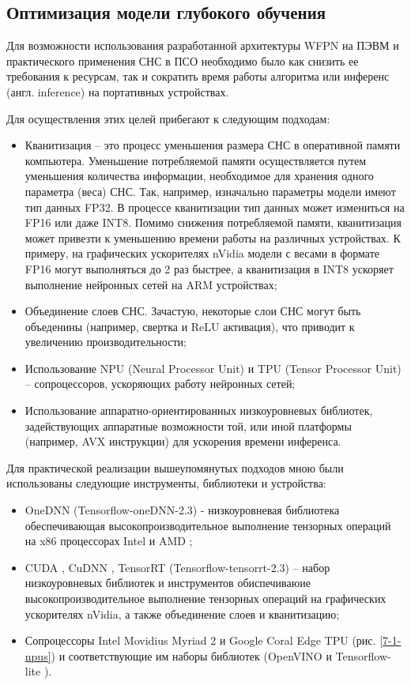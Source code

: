 \subsection{Оптимизация модели глубокого обучения} \label{sect-7-1}

Для возможности использования разработанной архитектуры WFPN на ПЭВМ и практического применения СНС в ПСО необходимо было как снизить ее требования к ресурсам, так и сократить время работы алгоритма или инференс (англ. inference) на портативных устройствах.

Для осуществления этих целей прибегают к следующим подходам:
\begin{itemize}
    \item Кванитизация -- это процесс уменьшения размера СНС в оперативной памяти компьютера. Уменьшение потребляемой памяти осуществляется путем уменьшения количества информации, необходимое для хранения одного параметра (веса) СНС. Так, например, изначально параметры модели имеют тип данных FP32. В процессе кванитизации тип данных может измениться на FP16 или даже INT8. Помимо снижения потребляемой памяти, кванитизация может привезти к уменьшению времени работы на различных устройствах. К примеру, на графических ускорителях nVidia модели с весами в формате FP16 могут выполняться до 2 раз быстрее, а кванитизация в INT8 ускоряет выполнение нейронных сетей на ARM устройствах;
    \item Объединение слоев СНС. Зачастую, некоторые слои СНС могут быть объеденины (например, свертка и ReLU активация), что приводит к увеличению производительности;
    \item Использование NPU (Neural Processor Unit) и TPU (Tensor Processor Unit) -- сопроцессоров, ускоряющих работу нейронных сетей;
    \item Использование аппаратно-ориентированных низкоуровневых библиотек, задействующих аппаратные возможности той, или иной платформы (например, AVX инструкции) для ускорения времени инференса.
\end{itemize}

Для практической реализации вышеупомянутых подходов мною были использованы следующие инструменты, библиотеки и устройства:

\begin{itemize}
    \item OneDNN (Tensorflow-oneDNN-2.3) - низкоуровневая библиотека обеспечивающая высокопроизводительное выполнение тензорных операций на x86 процессорах Intel и AMD \cite{lib-onednn};
    \item CUDA \cite{lib-cuda}, CuDNN \cite{lib-cudnn}, TensorRT \cite{lib-tensorrt} (Tensorflow-tensorrt-2.3) -- набор низкоуровневых библиотек и инструментов обиспечиваюие высокопроизводительное выполнение тензорных операций на графических ускорителях nVidia, а также объединение слоев и кванитизацию;
    \item Сопроцессоры Intel Movidius Myriad 2 \cite{lib-movidius} и Google Coral Edge TPU \cite{lib-coral} (рис. \ref{7-1-npus}) и соответствующие им наборы библиотек (OpenVINO \cite{lib-openvino} и Tensorflow-lite \cite{lib-tflite}).
\end{itemize}

